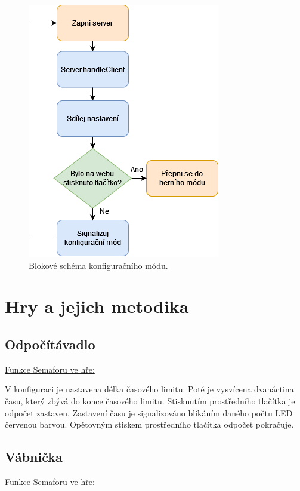 \begin{figure}[!h]
  \begin{center}
    \includegraphics[scale=0.75]{obrazky/blokove_schema_modu_CONFIGURATION.png}
  \end{center}
  \caption[Blokové schéma konfiguračního módu]{Blokové schéma konfiguračního módu.}
\end{figure}


\chapter{Hry a jejich metodika}

\section{Odpočítávadlo}
\underline{Funkce Semaforu ve hře:}

V konfiguraci je nastavena délka časového limitu. Poté je vysvícena dvanáctina času, který zbývá do konce časového limitu. Stisknutím prostředního tlačítka je odpočet zastaven. 
Zastavení času je signalizováno blikáním daného počtu LED červenou barvou. Opětovným stiskem prostředního tlačítka odpočet pokračuje. 

\section{Vábnička}
\underline{Funkce Semaforu ve hře:}

